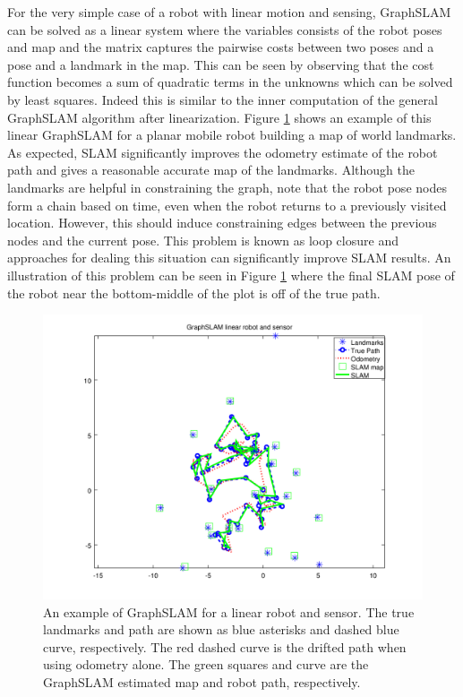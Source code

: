 \documentclass{article}
\begin{document}
For the very simple case of a robot with linear motion and sensing, GraphSLAM can be solved as a linear system where the variables consists of the robot poses and map and the matrix captures the pairwise costs between two poses and a pose and a landmark in the map.  This can be seen by observing that the cost function becomes a sum of quadratic terms in the unknowns which can be solved by least squares.  Indeed this is similar to the inner computation of the general GraphSLAM algorithm after linearization.  Figure \ref{fig:graphslamlinear} shows an example of this linear GraphSLAM for a planar mobile robot building a map of world landmarks.  As expected, SLAM significantly improves the odometry estimate of the robot path and gives a reasonable accurate map of the landmarks.  Although the landmarks are helpful in constraining the graph, note that the robot pose nodes form a chain based on time, even when the robot returns to a previously visited location.  However, this should induce constraining edges between the previous nodes and the current pose.  This problem is known as loop closure and approaches for dealing this situation can significantly improve SLAM results.  An illustration of this problem can be seen in Figure  \ref{fig:graphslamlinear} where the final SLAM pose of the robot near the bottom-middle of the plot is off of the true path.

\begin{figure}
\includegraphics[width=\linewidth]{graphslam/graphslamlinear.png}
\caption{An example of GraphSLAM for a linear robot and sensor.  The true landmarks and path are shown as blue asterisks and dashed blue curve, respectively.  The red dashed curve is the drifted path when using odometry alone.  The green squares and curve are the GraphSLAM estimated map and robot path, respectively.}
\label{fig:graphslamlinear}
\end{figure}
\end{document}
